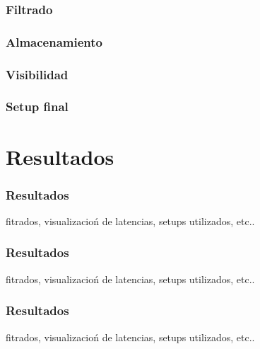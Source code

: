 \documentclass{beamer}
\begin{document}

\begin{frame}[fragile] %
\frametitle{Filtrado}

\end{frame}


\begin{frame}
\frametitle{Almacenamiento}

\end{frame}


\begin{frame}
\frametitle{Visibilidad}

\end{frame}


\begin{frame}
\frametitle{Setup final}

\end{frame}

\section{Resultados}


\begin{frame}
\frametitle{Resultados}
 fitrados, visualizacioń de latencias, setups utilizados, etc..

\end{frame}


\begin{frame}
\frametitle{Resultados}
fitrados, visualizacioń de latencias, setups utilizados, etc..

\end{frame}


\begin{frame}
\frametitle{Resultados}
fitrados, visualizacioń de latencias, setups utilizados, etc..

\end{frame}
\end{document}
